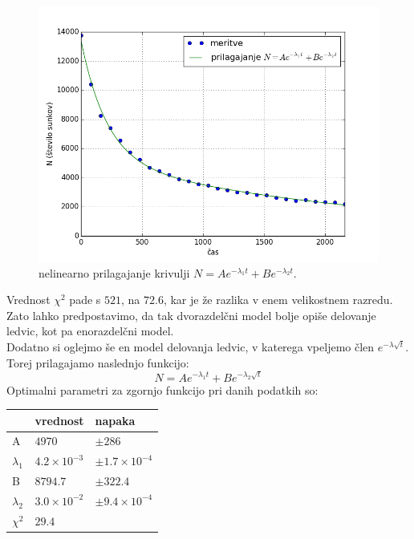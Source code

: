 \documentclass[slovene,11pt,a4paper]{article}
\numberwithin{equation}{section} %
\numberwithin{figure}{section} %
\numberwithin{table}{section} %
\begin{document}
\begin{figure}[h]
\centering
\includegraphics[scale=0.55]{slike/druga_1a.png}
\caption[farmacevt-dodatni-parameter]{nelinearno prilagajanje krivulji $N=A e^{- \lambda_1 t} + B e^{- \lambda_2 t}$.}
\label{fig:druga-3}
\end{figure}
Vrednost $\chi^2$ pade s $521$, na $72.6$, kar je že razlika v enem velikostnem razredu. Zato lahko predpostavimo, da tak dvorazdelčni model bolje opiše delovanje ledvic, kot pa enorazdelčni model.\\
Dodatno si oglejmo še en model delovanja ledvic, v katerega vpeljemo člen $e^{-\lambda \sqrt{t}}$. Torej prilagajamo naslednjo funkcijo:
\begin{equation}
\label{eq-koren}
N=A e^{- \lambda_1 t} + B e^{-\lambda_2 \sqrt{t}}
\end{equation}
Optimalni parametri za zgornjo funkcijo pri danih podatkih so:

\begin{table}[h]
\begin{center}

\begin{tabular}{l|l|l|}
\cline{2-3}
                                  & vrednost           & napaka             \\ \hline
\multicolumn{1}{|l|}{A}           & $4970$             & $\pm286$           \\ \hline
\multicolumn{1}{|l|}{$\lambda_1$} & $4.2\times10^{-3}$ & $\pm1.7\times10^{-4}$ \\ \hline
\multicolumn{1}{|l|}{B}           & $8794.7$           & $\pm322.4$         \\ \hline
\multicolumn{1}{|l|}{$\lambda_2$} & $3.0\times10^{-2}$ & $\pm9.4\times10^{-4}$ \\ \hline
\multicolumn{1}{|l|}{$\chi^2$}    & $29.4$             &                    \\ \hline
\end{tabular}
\end{center}
\end{table}
\end{document}
